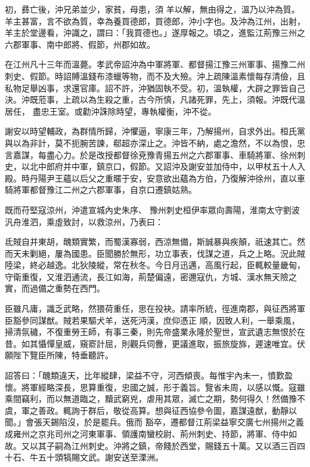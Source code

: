 \begin{pinyinscope}
 初，彞亡後，沖兄弟並少，家貧，母患，須
 羊以解，無由得之，溫乃以沖為質。羊主甚富，言不欲為質，幸為養買德郎，買德郎，沖小字也。及沖為江州，出射，羊主於堂邊看，沖識之，謂曰：「我買德也。」遂厚報之。頃之，進監江荊豫三州之六郡軍事、南中郎將、假節，州郡如故。



 在江州凡十三年而溫薨。孝武帝詔沖為中軍將軍、都督揚江豫三州軍事、揚豫二州刺史、假節。時詔賻溫錢布漆蠟等物，而不及大殮。沖上疏陳溫素懷每存清儉，且私物足舉凶事，求還官庫。詔不許，沖猶固執不受。初，溫執權，大辟之罪皆自己決。沖既蒞事，上疏以為生殺之重，古今所慎，凡諸死罪，先上，須報。沖既代溫居任，
 盡忠王室。或勸沖誅除時望，專執權衡，沖不從。



 謝安以時望輔政，為群情所歸，沖懼逼，寧康三年，乃解揚州，自求外出。桓氏黨與以為非計，莫不扼腕苦諫，郗超亦深止之。沖皆不納，處之澹然，不以為恨，忠言嘉謀，每盡心力。於是改授都督徐兗豫青揚五州之六郡軍事、車騎將軍、徐州刺史，以北中郎府并中軍，鎮京口，假節。又詔沖及謝安並加侍中，以甲杖五十人入殿。時丹陽尹王蘊以后父之重暱于安，安意欲出蘊為方伯，乃復解沖徐州，直以車騎將軍都督豫江二州之六郡軍事，自京口遷鎮姑熟。



 既而苻堅寇涼州，沖遣宣城內史朱序、
 豫州刺史桓伊率眾向壽陽，淮南太守劉波汎舟淮泗，乘虛致討，以救涼州，乃表曰：



 氐賊自并東胡，醜類實繁，而蜀漢寡弱，西涼無備，斯誠暴與疾顛，祇速其亡。然而天未剿絕，屢為國患。臣聞勝於無形，功立事表，伐謀之道，兵之上略。況此賊陸梁，終必越逸。北狄陵縱，常在秋冬。今日月迅邁，高風行起，臣輒較量畿甸，守衛重復，又淮泗通流，長江如海，荊楚偏遠，密邇寇仇，方城、漢水無天險之實，而過備之重勢在西門。



 臣雖凡庸，識乏武略，然猥荷重任，思在投袂。請率所統，徑進南郡，與征西將軍臣豁參同謀猷。賊若果驅犬羊，送死沔漢，庶仰憑正
 順，因致人利，一舉乘風，掃清氛穢，不復重勞王師，有事三秦，則先帝盛業永隆於聖世，宣武遺志無恨於在昔。如其懾憚皇威，窺窬計屈，則觀兵伺釁，更議進取，振旅旋旆，遲速唯宜。伏願陛下覽臣所陳，特垂聽許。



 詔答曰：「醜類違天，比年縱肆，梁益不守，河西傾喪。每惟宇內未一，憤歎盈懷。將軍經略深長，思算重復，忠國之誠，形于義旨。覽省未周，以感以慨。寇雖乘間竊利，而以無道臨之，黷武窮兇，虐用其眾，滅亡之期，勢何得久！然備豫不虞，軍之善政。輒詢于群后，敬從高算。想與征西協參令圖，嘉謀遠猷，動靜以聞。」會張天錫陷沒，於是罷兵。俄而
 豁卒，遷都督江荊梁益寧交廣七州揚州之義成雍州之京兆司州之河東軍事、領護南蠻校尉、荊州刺史、持節，將軍、侍中如故。又以其子嗣為江州刺史。沖將之鎮，帝餞於西堂，賜錢五十萬。又以酒三百四十石、牛五十頭犒賜文武。謝安送至溧洲。




\end{pinyinscope}
